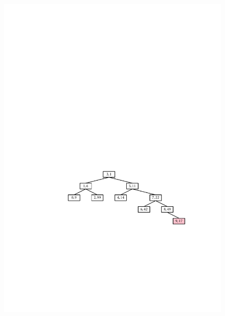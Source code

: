 \begin{figure}
\begin{center}
  \includegraphics[height=\QuarterHeightScaleIfNeeded]{figs/treap-delete-c} \\

\end{center}
\end{figure}
